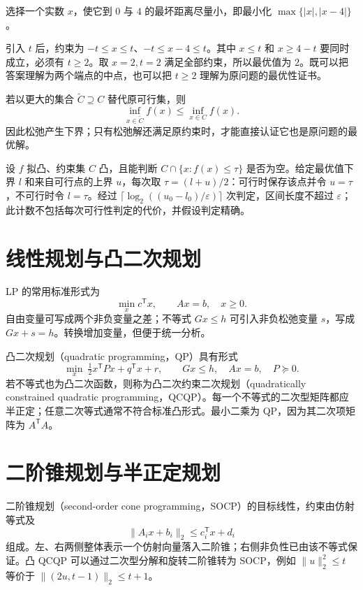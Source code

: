 \begin{example}[极小极大问题的手算与线性规划]
选择一个实数 $x$，使它到 $0$ 与 $4$ 的最坏距离尽量小，即最小化 $\max\{|x|,|x-4|\}$。
\end{example}
\begin{solve}
引入 $t$ 后，约束为 $-t\leq x\leq t$、$-t\leq x-4\leq t$。其中 $x\leq t$ 和 $x\geq4-t$ 要同时成立，必须有 $t\geq2$。取 $x=2,t=2$ 满足全部约束，所以最优值为 $2$。既可以把答案理解为两个端点的中点，也可以把 $t\geq2$ 理解为原问题的最优性证书。
\end{solve}

若以更大的集合 $\widetilde C\supseteq C$ 替代原可行集，则
\[
 \inf_{x\in\widetilde C}f(x)\leq\inf_{x\in C}f(x).
\]
因此松弛产生下界；只有松弛解还满足原约束时，才能直接认证它也是原问题的最优解。

设 $f$ 拟凸、约束集 $C$ 凸，且能判断 $C\cap\{x:f(x)\leq\tau\}$ 是否为空。给定最优值下界 $l$ 和来自可行点的上界 $u$，每次取 $\tau=(l+u)/2$：可行时保存该点并令 $u=\tau$，不可行时令 $l=\tau$。经过 $\lceil\log_2((u_0-l_0)/\varepsilon)\rceil$ 次判定，区间长度不超过 $\varepsilon$；此计数不包括每次可行性判定的代价，并假设判定精确。

\section{线性规划与凸二次规划}

LP 的常用标准形式为
\[
 \min_x c^{\mathsf T}x,\qquad Ax=b,\quad x\geq0.
\]
自由变量可写成两个非负变量之差；不等式 $Gx\leq h$ 可引入非负松弛变量 $s$，写成 $Gx+s=h$。转换增加变量，但便于统一分析。

凸二次规划（quadratic programming，QP）具有形式
\[
 \min_x\ \tfrac12x^{\mathsf T}Px+q^{\mathsf T}x+r,
 \qquad Gx\leq h,\quad Ax=b,\quad P\succeq0.
\]
若不等式也为凸二次函数，则称为凸二次约束二次规划（quadratically constrained quadratic programming，QCQP）。每一个不等式的二次型矩阵都应半正定；任意二次等式通常不符合标准凸形式。最小二乘为 QP，因为其二次项矩阵为 $A^{\mathsf T}A$。

\section{二阶锥规划与半正定规划}

二阶锥规划（second-order cone programming，SOCP）的目标线性，约束由仿射等式及
\[
 \|A_i x+b_i\|_2\leq c_i^{\mathsf T}x+d_i
\]
组成。左、右两侧整体表示一个仿射向量落入二阶锥；右侧非负性已由该不等式保证。凸 QCQP 可以通过二次型分解和旋转二阶锥转为 SOCP，例如 $\|u\|_2^2\leq t$ 等价于 $\|(2u,t-1)\|_2\leq t+1$。

